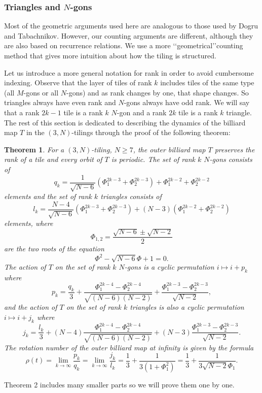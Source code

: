 \documentclass[11pt, oneside]{article}   	%
\newtheorem{theorem}{Theorem}
\begin{document}
\subsubsection{Triangles and $N$-gons}\label{sec:3-N}
\indent \indent Most of the geometric arguments used here are analogous to those used by Dogru and Tabachnikov. However, our counting arguments are different, although they are also based on recurrence relations. We use a more \lq \lq geometrical\rq \rq counting method that gives more intuition about how the tiling is structured. 

Let us introduce a more general notation for rank in order to avoid cumbersome indexing. Observe that the layer of tiles of rank $k$ includes tiles of the same type (all $M$-gons or all $N$-gons) and as rank changes by one, that shape changes. So triangles always have even rank and $N$-gons always have odd rank. We will say that a rank $2k-1$ tile is a rank $k$ $N$-gon and a rank $2k$ tile is a rank $k$ triangle. The rest of this section is dedicated to describing the dynamics of the billiard map $T$ in the $(3,N)$-tilings through the proof of the following theorem:
\begin{theorem}
For a $(3,N)$-tiling, $N\geq 7$, the outer billiard map $T$ preserves the rank of a tile and every orbit of $T$ is periodic. The set of rank $k$ $N$-gons consists of 
\[q_k=\frac{1}{\sqrt{N-6}}(\Phi_1^{2k-3}+\Phi_2^{2k-3})+\Phi_1^{2k-2}+\Phi_2^{2k-2}\]
elements and the set of rank $k$ triangles consists of
\[l_k=\frac{N-4}{\sqrt{N-6}}(\Phi_1^{2k-3}+\Phi_2^{2k-3})+(N-3)(\Phi_1^{2k-2}+\Phi_2^{2k-2})\]
elements, where
$$\Phi_{1,2}=\frac{\sqrt{N-6}\pm\sqrt{N-2}}{2}$$
are the two roots of the equation $$\Phi^2-\sqrt{N-6}\Phi+1=0.$$ The action of $T$ on the set of rank $k$ $N$-gons is a cyclic permutation $i\mapsto i+p_k$ where 
\[p_k=\frac{q_k}{3}+\frac{\Phi_1^{2k-4}-\Phi_2^{2k-4}}{\sqrt{(N-6)(N-2)}}+\frac{\Phi_1^{2k-3}-\Phi_2^{2k-3}}{\sqrt{N-2}},\]
and the action of $T$ on the set of rank $k$ triangles is also a cyclic permutation $i\mapsto i+j_k$ where
\[j_k= \frac{l_k}{3}+(N-4)\frac{\Phi_1^{2k-4}-\Phi_2^{2k-4}}{\sqrt{(N-6)(N-2)}}+(N-3)\frac{\Phi_1^{2k-3}-\Phi_2^{2k-3}}{\sqrt{N-2}}.\]
The rotation number of the outer billiard map at infinity is given by the formula 
\[\rho(t)=\lim_{k\to\infty}\frac{p_k}{q_k}=\lim_{k\to\infty}\frac{j_k}{l_k}=\frac{1}{3}+\frac{1}{3(1+\Phi_1^2)}=\frac{1}{3}+\frac{1}{3\sqrt{N-2}\Phi_1}.\]
\end{theorem}

Theorem 2 includes many smaller parts so we will prove them one by one.
\end{document}
